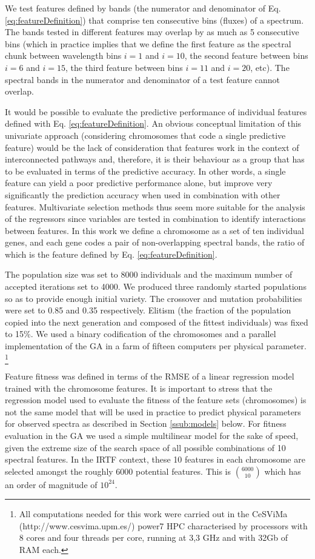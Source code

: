 We test features defined by bands (the numerator and denominator of
Eq. \ref{eq:featureDefinition}) that comprise ten consecutive bins
(fluxes) of a spectrum. The bands tested in different features may
overlap by as much as 5 consecutive bins (which in practice implies
that we define the first feature as the spectral chunk between
wavelength bins $i=1$ and $i=10$, the second feature between bins
$i=6$ and $i=15$, the third feature between bins $i=11$ and $i=20$,
etc). The spectral bands in the numerator and denominator of a test
feature cannot overlap.

It would be possible to evaluate the predictive performance of
individual features defined with Eq. \ref{eq:featureDefinition}. An
obvious conceptual limitation of this univariate approach (considering
chromosomes that code a single predictive feature) would be the lack
of consideration that features work in the context of interconnected
pathways and, therefore, it is their behaviour as a group that has to
be evaluated in terms of the predictive accuracy. In other words, a
single feature can yield a poor predictive performance alone, but
improve very significantly the prediction accuracy when used in
combination with other features. Multivariate selection methods thus
seem more suitable for the analysis of the regressors since variables
are tested in combination to identify interactions between
features. In this work we define a chromosome as a set of ten
individual genes, and each gene codes a pair of non-overlapping
spectral bands, the ratio of which is the feature defined by
Eq. \ref{eq:featureDefinition}.

The population size was set to 8000 individuals and the maximum number
of accepted iterations set to 4000. We produced three randomly started
populations so as to provide enough initial variety. The crossover and
mutation probabilities were set to 0.85 and 0.35 respectively. 
Elitism (the fraction of the population copied into the next
generation and composed of the fittest individuals) was fixed to
15\%. We used a binary codification of the chromosomes and a parallel
implementation of the GA in a farm of fifteen computers per physical
parameter. \footnote{All computations needed for this work were
carried out in the CeSViMa (http://www.cesvima.upm.es/) power7 HPC
characterised by processors with 8 cores and four threads per
core, running at 3,3 GHz and with 32Gb of RAM each.}

Feature fitness was defined in terms of the RMSE of a linear
regression model trained with the chromosome features. It is important
to stress that the regression model used to evaluate the fitness of
the feature sets (chromosomes) is not the same model that will be used
in practice to predict physical parameters for observed spectra as
described in Section \ref{ssub:models} below. For fitness
evaluation in the GA we used a simple multilinear model for the sake
of speed, given the extreme size of the search space of all possible
combinations of 10 spectral features. In the IRTF context, these 10
features in each chromosome are selected amongst the roughly 6000
potential features. This is $\binom{6000}{10}$ which has an order of
magnitude of $10^{24}$.

